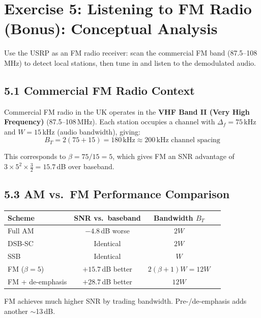 \documentclass[../../main.tex]{subfiles}
\begin{document}
\newpage

\section{Exercise 5: Listening to FM Radio (Bonus): Conceptual Analysis}

\begin{GoalBox}
Use the USRP as an FM radio receiver: scan the commercial FM band (87.5--108\,MHz) to detect local stations, then tune in and listen to the demodulated audio.
\end{GoalBox}

\vspace{1em}

\subsection{5.1 \; Commercial FM Radio Context}

Commercial FM radio in the UK operates in the \textbf{VHF Band II (Very High Frequency)} (87.5--108\,MHz). Each station occupies a channel with $\Delta_f = 75$\,kHz and $W = 15$\,kHz (audio bandwidth), giving:
\[
  B_T = 2(75 + 15) = 180\,\text{kHz} \approx 200\,\text{kHz channel spacing}
\]

This corresponds to $\beta = 75/15 = 5$, which gives FM an SNR advantage of $3 \times 5^2 \times \frac{3}{2} = 15.7$\,dB over baseband.

\vspace{0.5em}

\subsection{5.3 \; AM vs.\ FM Performance Comparison}

\begin{KeyBox}
\begin{center}
\renewcommand{\arraystretch}{1.3}
\begin{tabular}{lccc}
\toprule
\textbf{Scheme} & \textbf{SNR vs.\ baseband} & \textbf{Bandwidth $B_T$} \\
\midrule
Full AM    & $-4.8$\,dB worse  & $2W$ \\
DSB-SC     & Identical          & $2W$ \\
SSB        & Identical          & $W$ \\
FM ($\beta = 5$) & $+15.7$\,dB better & $2(\beta+1)W = 12W$ \\
FM + de-emphasis & $+28.7$\,dB better & $12W$ \\
\bottomrule
\end{tabular}
\end{center}
FM achieves much higher SNR by trading bandwidth. Pre-/de-emphasis adds another $\sim$13\,dB.
\end{KeyBox}
\end{document}
